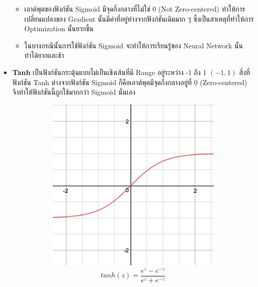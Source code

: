 \begin{itemize}
\begin{itemize}
        \item เอาต์พุตของฟังก์ชัน Sigmoid มีจุดกึ่งกลางที่ไม่ใช่ 0 (Not Zero-centered) ทำให้การเปลี่ยนแปลงของ Gradient 
        นั้นมีค่าที่อยู่ห่างจากฟังก์ชันเดิมมาก ๆ ซึ่งเป็นสาเหตุที่ทำให้การ Optimization นั้นยากขึ้น

        \item ในบางกรณีนั้นการใช้ฟังก์ชัน Sigmoid จะทำให้การเรียนรู้ของ Neural Network นั้นทำได้ยากและช้า
    \end{itemize}

    \item \textbf{Tanh} เป็นฟังก์ชันกระตุ้นแบบไม่เป็นเชิงเส้นที่มี Range อยู่ระหว่าง -1 ถึง 1 $(-1, 1)$ สิ่งที่ฟังก์ชัน Tanh ต่างจากฟังก์ชัน 
    Sigmoid ก็คือเอาต์พุตมีจุดกึ่งกลางอยู่ที่ 0 (Zero-centered) จึงทำให้ฟังก์ชันนี้ถูกใช้มากกว่า Sigmoid นั่นเอง
    \begin{figure}[H]
        \centering
        \begin{subfigure}{0.5\textwidth}
            \centering
            \includegraphics[width=0.9\linewidth]{fig/actfunc_tanh.png}
            \caption{%
                \begin{equation}
                    tanh(z) = \frac{e^{z} - e^{-z}}{e^{z} + e^{-z}}
                \end{equation}
            }
            \label{fig:actfunc_tanh}
        \end{subfigure}%
        \begin{subfigure}{0.5\textwidth}

\end{subfigure}
\end{figure}
\end{itemize}
